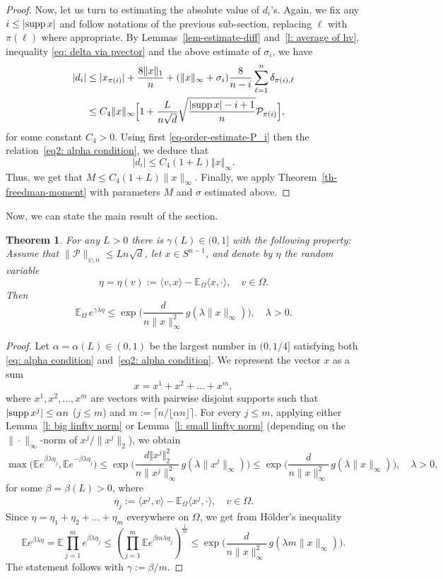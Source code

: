 \documentclass[12pt]{article}
\newtheorem{theorem}{Theorem}[section]
\theoremstyle{definition}
\theoremstyle{plain}
\newcommand{\E}{\mathbb{E}}
\newcommand{\supp}{{\rm supp\,}}
\def\pvector{{\mathcal P}}
\def\gfunction{{g}}
\begin{document}
\begin{proof}
Now, let us turn to estimating the absolute value of $d_i$'s. Again, we fix any $i\leq |\supp x|$
and follow notations of the previous sub-section,
replacing $\ell$ with $\pi(\ell)$ where appropriate.
By Lemmas~\ref{lem-estimate-diff} and~\ref{l: average of hv},
inequality \eqref{eq: delta via pvector} and the above estimate of $\sigma_i$, we have
\begin{align*}
\vert d_i\vert &\leq |x_{\pi(i)}|+\frac{8\Vert x\Vert_1}{n}
+(\Vert x\Vert_\infty+\sigma_i)\frac{8}{n-i} \sum_{\ell=1}^n \delta_{\pi(i),\ell}\\ 
& \leq C_4\Vert x\Vert_\infty \Big[1+ \frac{L}{n\sqrt{d}} \sqrt{\frac{|\supp x|-i+1}{n}} \pvector_{\pi(i)}\Big],
\end{align*}
for some constant $C_4>0$. 
Using first \eqref{eq-order-estimate-P_i} then the relation~\eqref{eq2: alpha condition}, we deduce that 
$$
\vert d_i\vert\leq C_4(1+L)\Vert x\Vert_\infty.
$$
Thus, we get that $M\leq C_4 (1+ L) \|x\|_\infty$.
Finally, we apply Theorem~\ref{th-freedman-moment} with parameters
$M$ and $\sigma$ estimated above.
\end{proof}


Now, we can state the main result of the section.
\begin{theorem}\label{th-concentration-row}
For any $L>0$ there is $\gamma(L)\in(0,1]$ with the following property:
Assume that $\|\pvector\|_{\psi,n}\leq Ln\sqrt{d}$, let $x\in S^{n-1}$, and denote by $\eta$ the random variable
$$\eta=\eta(v):=\langle v,x\rangle-\E_\Omega\langle x,\cdot\rangle,\quad v\in \Omega.$$
Then
$$\E_\Omega\, e^{\gamma\lambda \eta}
\leq \exp\bigg(\frac{d}{n\|x\|_\infty^2}\,\gfunction(\lambda \|x\|_\infty)\bigg),\quad \lambda>0.$$
\end{theorem}
\begin{proof}
Let $\alpha=\alpha(L)\in(0,1)$ be the largest number in $(0,1/4]$ satisfying both
\eqref{eq: alpha condition} and~\eqref{eq2: alpha condition}.
We represent the vector $x$ as a sum
$$x=x^1+x^2+\ldots+x^m,$$
where $x^1,x^2,\ldots,x^m$ are vectors with pairwise disjoint supports such that $|\supp x^j|\leq \alpha n$ ($j\leq m$)
and $m:=\big\lceil n/\lfloor \alpha n\rfloor\big\rceil$. For every $j\leq m$, applying either Lemma~\ref{l: big linfty norm}
or Lemma~\ref{l: small linfty norm} (depending on the $\|\cdot\|_\infty$-norm of $x^j/\|x^j\|_2$), we obtain
$$
\max\big(\E e^{\beta \lambda \eta_j},\E e^{-\beta \lambda \eta_j}\big)
\leq\exp\bigg(\frac{d\Vert x^j\Vert_2^2}{n\|x^j\|_\infty^2} \,\gfunction(\lambda \|x^j\|_\infty) \bigg)\leq 
\exp\bigg(\frac{d}{n\|x\|_\infty^2}\,\gfunction(\lambda \|x\|_\infty)\bigg),\quad \lambda>0,$$
for some $\beta=\beta(L)>0$, where
$$\eta_j:=\langle x^j,v\rangle-\E_\Omega\langle x^j,\cdot\rangle,\quad v\in \Omega.$$
Since $\eta= \eta_1+\eta_2+\ldots+\eta_m$ everywhere on $\Omega$, we get from H\"older's inequality 
$$
\E e^{\beta \lambda \eta}= \E \prod_{j=1}^m e^{\beta \lambda \eta_j}\leq \left(\prod_{j=1}^m \E e^{\beta m\lambda \eta_j}\right)^{\frac{1}{m}} 
\leq \exp\bigg(\frac{d}{n\|x\|_\infty^2}\,\gfunction(\lambda m \|x\|_\infty)\bigg).
$$
The statement follows with $\gamma:=\beta/m$.
\end{proof}
\end{document}
